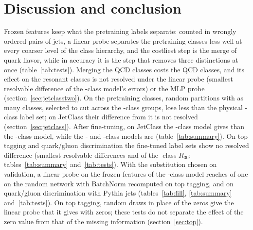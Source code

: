 \section{Discussion and conclusion}\label{sec:discussion}

Frozen features keep what the pretraining labels separate: counted in wrongly ordered pairs of jets, a linear
probe separates the \Kfull{} pretraining classes less well at every coarser level of the class hierarchy, and the
costliest step is the merge of quark flavor, while in accuracy it is the step that removes three distinctions at once
(table~\ref{tab:tests}). %
Merging the QCD classes costs the QCD classes, and its effect on the resonant classes is not resolved under the linear
probe (smallest resolvable difference \MlstPwResonantRes{} of the \Kfull-class model's errors) or the MLP probe
(section~\ref{sec:jetclasstwo}). On the pretraining classes, random partitions
with as many classes, selected to cut across the \Kcoarse-class groups, lose less than the physical
\Kcoarse-class label set; on JetClass their difference from it is not resolved (section~\ref{sec:jetclass}).
After fine-tuning, on JetClass the
\Kcoarse-class model gives  than the \Kfull-class model, while the
\Kres- and \Kmid-class models are  (table~\ref{tab:summary}).
On top tagging and quark/gluon discrimination the fine-tuned label sets show no
resolved difference (smallest resolvable differences \MlstPwRthirtyFtTop{} and \MlstPwRthirtyFtQg{} of the
\Kfull-class $R_{30}$; tables~\ref{tab:summary} and~\ref{tab:tests}).
With the substitution chosen on validation, a linear probe on the frozen features of the \Kfull-class model
reaches \MlstLpTopRthirtyFullOverInitBnPr{} of one on the random network with BatchNorm recomputed on top tagging, and
\MlstLpQgRthirtyFullOverInitBnPr{} on quark/gluon discrimination with Pythia jets (tables~\ref{tab:fill},
\ref{tab:summary} and~\ref{tab:tests}).
On top tagging, random draws in place of the zeros give the linear probe
\MlstLpTopRthirtyDrawOverZeroFullPr{} that it gives with zeros; these tests do not separate the effect of the zero
value from that of the missing information (section~\ref{sec:top}). %

